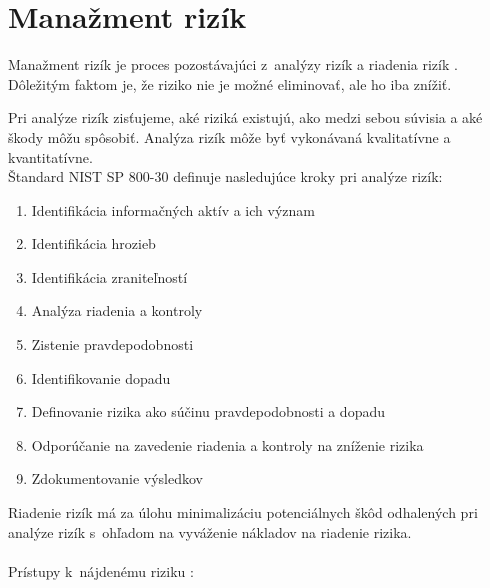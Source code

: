 \section{Manažment rizík}
\label{riskmanagement}
Manažment rizík je proces pozostávajúci z~analýzy rizík a riadenia rizík \cite{McMillan2018}. Dôležitým faktom je, že riziko nie je možné eliminovať, ale ho iba znížiť.

Pri analýze rizík zisťujeme, aké riziká existujú, ako medzi sebou súvisia a aké škody môžu spôsobiť. Analýza rizík môže byť vykonávaná kvalitatívne a kvantitatívne.\\ 
\newpage
\noindent
Štandard NIST SP 800-30 \cite{7TVhmfuQFbsOANAz} definuje nasledujúce kroky pri analýze rizík:

\begin{enumerate}
	\item Identifikácia informačných aktív a ich význam
	\item Identifikácia hrozieb
	\item Identifikácia zraniteľností
	\item Analýza riadenia a kontroly 
	\item Zistenie pravdepodobnosti
	\item Identifikovanie dopadu
	\item Definovanie rizika ako súčinu pravdepodobnosti a dopadu
	\item Odporúčanie na zavedenie riadenia a kontroly na zníženie rizika  
	\item Zdokumentovanie výsledkov
\end{enumerate} 
\vspace{2em}
Riadenie rizík má za úlohu minimalizáciu potenciálnych škôd odhalených pri analýze rizík s~ohľadom na vyváženie nákladov na riadenie rizika. 
\\\\
\noindent
Prístupy k~nájdenému riziku \cite{Vyncke2008}\cite{McMillan2018}\cite{Jackson2010}:
